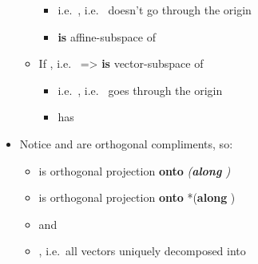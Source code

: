 \begin{itemize}
\begin{itemize}
    \begin{itemize}
    
    \item
      i.e.~, i.e.~ doesn't go
      through the origin
    \item
       \textbf{is} affine-subspace of 
    \end{itemize}
  \item
    If ,
    i.e.~ =\textgreater{}
     \textbf{is} vector-subspace of 

    \begin{itemize}
    
    \item
      i.e.~, i.e.~ goes through the
      origin
    \item
       has 
    \end{itemize}
  \end{itemize}
\item
  Notice  and
   are orthogonal compliments,
  so:

  \begin{itemize}
  
  \item
    is orthogonal projection \textbf{onto} 
    \emph{(\textbf{along} )}
  \item
    is orthogonal projection \textbf{onto}  *(\textbf{along}
    )
  \item
    and
  \item
    ,
    i.e.~all vectors  uniquely
    decomposed into
  \end{itemize}
\end{itemize}

